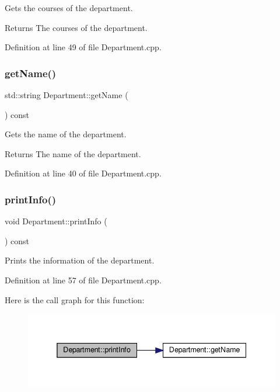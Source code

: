 Gets the courses of the department. \begin{DoxyReturn}{Returns}
The courses of the department. 
\end{DoxyReturn}


Definition at line 49 of file Department.\+cpp.

\mbox{\label{classDepartment_a3ada89e70eae97b429c9a82f601e98c0}} 
\subsubsection{\texorpdfstring{get\+Name()}{getName()}}
{\footnotesize\ttfamily std\+::string Department\+::get\+Name (\begin{DoxyParamCaption}{ }\end{DoxyParamCaption}) const}

Gets the name of the department. \begin{DoxyReturn}{Returns}
The name of the department. 
\end{DoxyReturn}


Definition at line 40 of file Department.\+cpp.

\mbox{\label{classDepartment_ab15a7312cdf65f53c3796c428bb6211b}} 
\subsubsection{\texorpdfstring{print\+Info()}{printInfo()}}
{\footnotesize\ttfamily void Department\+::print\+Info (\begin{DoxyParamCaption}{ }\end{DoxyParamCaption}) const}

Prints the information of the department. 

Definition at line 57 of file Department.\+cpp.

Here is the call graph for this function\+:\nopagebreak
\begin{figure}[H]
\begin{center}
\leavevmode
\includegraphics[width=338pt]{classDepartment_ab15a7312cdf65f53c3796c428bb6211b_cgraph}
\end{center}
\end{figure}
\mbox{\label{classDepartment_a52742b6ce155016eb084ccd2faccdeef}} 
